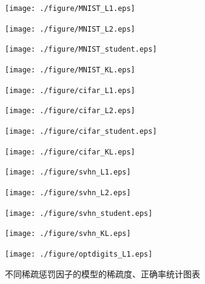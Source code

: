 \documentclass[oneside]{ZJUthesis}
\begin{document}
\begin{figure}[h]	  
\caption{不同稀疏惩罚因子的模型的稀疏度、正确率统计图表\label{fig:sparsitylevel}}
\begin{minipage}[h]{0.23\linewidth}
\centering
\texttt{[image: ./figure/MNIST\_L1.eps]}
\end{minipage}
\hfill
\begin{minipage}[h]{0.24\linewidth}
\centering
\texttt{[image: ./figure/MNIST\_L2.eps]}
\end{minipage}
\hfill
\begin{minipage}[h]{0.24\linewidth}
\centering
\texttt{[image: ./figure/MNIST\_student.eps]}
\end{minipage}
\hfill
\begin{minipage}[h]{0.24\linewidth}
\centering
\texttt{[image: ./figure/MNIST\_KL.eps]}
\end{minipage}
\hfill
\begin{minipage}[h]{0.24\linewidth}
\centering
\texttt{[image: ./figure/cifar\_L1.eps]}
\end{minipage}
\hfill
\begin{minipage}[h]{0.24\linewidth}
\centering
\texttt{[image: ./figure/cifar\_L2.eps]}
\end{minipage}
\hfill
\begin{minipage}[h]{0.24\linewidth}
\centering
\texttt{[image: ./figure/cifar\_student.eps]}
\end{minipage}
\hfill
\begin{minipage}[h]{0.23\linewidth}
\centering
\texttt{[image: ./figure/cifar\_KL.eps]}
\end{minipage}
\hfill
\begin{minipage}[h]{0.24\linewidth}
\centering
\texttt{[image: ./figure/svhn\_L1.eps]}
\end{minipage}
\hfill
\begin{minipage}[h]{0.24\linewidth}
\centering
\texttt{[image: ./figure/svhn\_L2.eps]}
\end{minipage}
\hfill
\begin{minipage}[h]{0.24\linewidth}
\centering
\texttt{[image: ./figure/svhn\_student.eps]}
\end{minipage}
\hfill
\begin{minipage}[h]{0.24\linewidth}
\centering
\texttt{[image: ./figure/svhn\_KL.eps]}
\end{minipage}
\hfill
\begin{minipage}[h]{0.24\linewidth}
\centering
\texttt{[image: ./figure/optdigits\_L1.eps]}
\end{minipage}

\end{figure}
\end{document}
